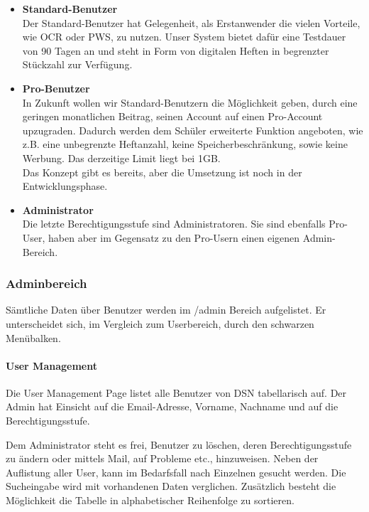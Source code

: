 \begin{itemize}
\item \textbf{Standard-Benutzer}\\ Der Standard-Benutzer hat Gelegenheit, als Erstanwender die vielen Vorteile, wie OCR oder PWS, zu nutzen. Unser System bietet dafür eine Testdauer von 90 Tagen an und steht in Form von digitalen Heften in begrenzter Stückzahl zur Verfügung.
\item \textbf{Pro-Benutzer}\\ In Zukunft wollen wir Standard-Benutzern die Möglichkeit geben, durch eine geringen monatlichen Beitrag, seinen Account auf einen Pro-Account upzugraden. Dadurch werden dem Schüler erweiterte Funktion angeboten, wie z.B. eine unbegrenzte Heftanzahl, keine Speicherbeschränkung, sowie keine Werbung. Das derzeitige Limit liegt bei 1GB.\\
Das Konzept gibt es bereits, aber die Umsetzung ist noch in der Entwicklungsphase.
\item \textbf{Administrator}\\ Die letzte Berechtigungsstufe sind Administratoren. Sie sind ebenfalls Pro-User, haben aber im Gegensatz zu den Pro-Usern einen eigenen Admin-Bereich.
\end{itemize}

\subsubsection{Adminbereich}
Sämtliche Daten über Benutzer werden im /admin Bereich aufgelistet. Er unterscheidet sich, im Vergleich zum Userbereich, durch den schwarzen Menübalken.
\paragraph{User Management}
Die User Management Page listet alle Benutzer von DSN tabellarisch auf. Der Admin hat Einsicht auf die Email-Adresse, Vorname, Nachname und auf die Berechtigungsstufe.

Dem Administrator steht es frei, Benutzer zu löschen, deren Berechtigungsstufe zu ändern oder mittels Mail, auf Probleme etc., hinzuweisen. Neben der Auflistung aller User, kann im Bedarfsfall nach Einzelnen gesucht werden. Die Sucheingabe wird mit vorhandenen Daten verglichen. Zusätzlich besteht die Möglichkeit die Tabelle in alphabetischer Reihenfolge zu sortieren.

